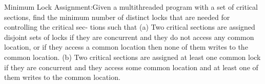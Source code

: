 Minimum Lock Assignment:Given a multithreaded program with a set of critical sections, find the minimum number of distinct locks that are needed for controlling the critical sec- tions such that
(a) Two critical sections are assigned disjoint sets of locks if they are concurrent and they do not access any common location, or if they access a common location then none of them writes to the common location.
(b) Two critical sections are assigned at least one common lock if they are concurrent and they access some common location and at least one of them writes to the common location.
